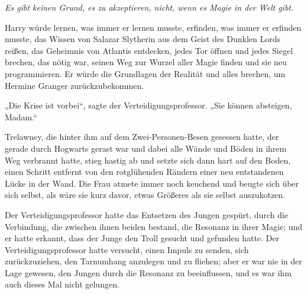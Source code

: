 \emph{Es gibt keinen Grund, es zu akzeptieren, nicht, wenn es Magie in der Welt gibt.}


Harry würde lernen, was immer er lernen musste, erfinden, was immer er erfinden musste, das Wissen von Salazar Slytherin aus dem Geist des Dunklen Lords reißen, das Geheimnis von Atlantis entdecken, jedes Tor öffnen und jedes Siegel brechen, das nötig war, seinen Weg zur Wurzel aller Magie finden und sie neu programmieren. Er würde die Grundlagen der Realität und alles brechen, um Hermine Granger zurückzubekommen.

\later

„Die Krise ist vorbei“, sagte der Verteidigungsprofessor. „Sie können absteigen, Madam.“

Trelawney, die hinter ihm auf dem Zwei-Personen-Besen gesessen hatte, der gerade durch Hogwarts gerast war und dabei alle Wände und Böden in ihrem Weg verbrannt hatte, stieg hastig ab und setzte sich dann hart auf den Boden, einen Schritt entfernt von den rotglühenden Rändern einer neu entstandenen Lücke in der Wand. Die Frau atmete immer noch keuchend und beugte sich über sich selbst, als wäre sie kurz davor, etwas Größeres als sie selbst auszukotzen.

Der Verteidigungsprofessor hatte das Entsetzen des Jungen gespürt, durch die Verbindung, die zwischen ihnen beiden bestand, die Resonanz in ihrer Magie; und er hatte erkannt, dass der Junge den Troll gesucht und gefunden hatte. Der Verteidigungsprofessor hatte versucht, einen Impuls zu senden, sich zurückzuziehen, den Tarnumhang anzulegen und zu fliehen; aber er war nie in der Lage gewesen, den Jungen durch die Resonanz zu beeinflussen, und es war ihm auch dieses Mal nicht gelungen.

